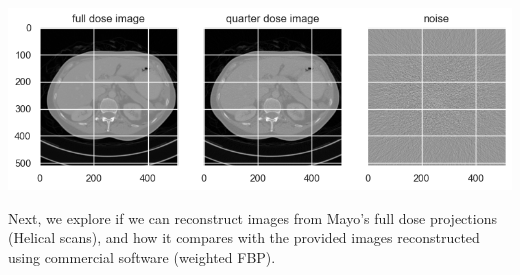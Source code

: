 \documentclass[a4paper, 11pt]{article}
\begin{document}
\begin{center}
\includegraphics[width=.9\linewidth]{./.ob-jupyter/4f73051cb4e57d44caff601d7dfd131deed886f5.png}
\end{center}

Next, we explore if we can reconstruct images from Mayo's full dose projections (Helical scans), and how it compares with the provided images reconstructed using commercial software (weighted FBP).
\end{document}

